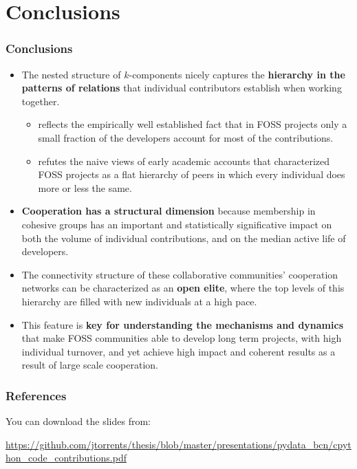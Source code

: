 \documentclass[ignorenonframetext,red,8pt,notes=hide]{beamer}
\begin{document}
\section{Conclusions}

\begin{frame}
\frametitle{Conclusions}

\begin{itemize}


\item The nested structure of $k$-components nicely captures the \textbf{hierarchy in the patterns of relations} that individual contributors establish when working together.

\begin{itemize}
\item reflects the empirically well established fact that in FOSS projects only a small fraction of the developers account for most of the contributions.

\item refutes the naive views of early academic accounts that characterized FOSS projects as a flat hierarchy of peers in which every individual does more or less the same.
\end{itemize}

\item \textbf{Cooperation has a structural dimension} because membership in cohesive groups has an important and statistically significative impact on both the volume of individual contributions, and on the median active life of developers.

\item The connectivity structure of these collaborative communities' cooperation networks can be characterized as an \textbf{open elite}, where the top levels of this hierarchy are filled with new individuals at a high pace. 

\item This feature is \textbf{key for understanding the mechanisms and dynamics} that make FOSS communities able to develop long term projects, with high individual turnover, and yet achieve high impact and coherent results as a result of large scale cooperation.

\end{itemize}

\end{frame}




\begin{frame}[label=biblio]
\frametitle{References}
You can download the slides from: 
\begin{small}
\href{https://github.com/jtorrents/thesis/blob/master/presentations/pydata_bcn/cpython_code_contributions.pdf}{https://github.com/jtorrents/thesis/blob/master/presentations/pydata\_bcn/cpython\_code\_contributions.pdf}


\end{small}
\end{frame}
\end{document}
